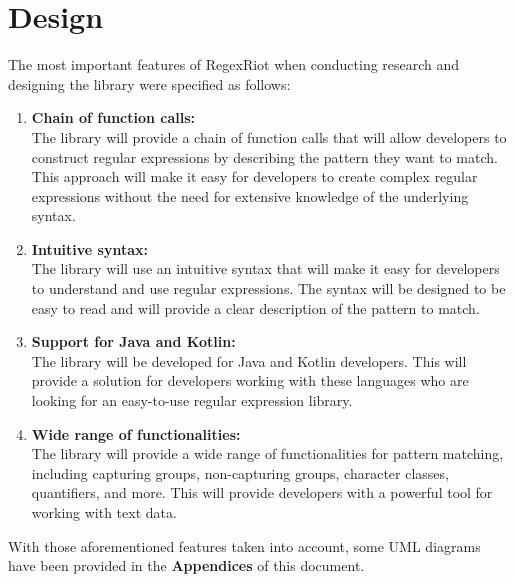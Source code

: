 \documentclass[conference]{IEEEtran}
\begin{document}
\section{Design}

The most important features of RegexRiot when conducting research and
designing the library were specified as follows:

\begin{enumerate}
    \item \textbf{Chain of function calls:}\\
          The library will provide a chain of function calls that will allow developers
          to construct regular expressions by describing the pattern they want to match.
          This approach will make it easy for developers to create complex regular expressions
          without the need for extensive knowledge of the underlying syntax.

    \item \textbf{Intuitive syntax:}\\
          The library will use an intuitive syntax that will make it easy for developers
          to understand and use regular expressions. The syntax will be designed to be easy
          to read and will provide a clear description of the pattern to match.

    \item \textbf{Support for Java and Kotlin:}\\
          The library will be developed for Java and Kotlin developers. \cite{oracle_docs1997}
          This will provide a solution for developers working with these languages who are
          looking for an easy-to-use regular expression library.\cite{kotlin_docs2023}

          \vfill\eject

    \item \textbf{Wide range of functionalities:}\\
          The library will provide a wide range of functionalities for pattern matching,
          including capturing groups, non-capturing groups, character classes, quantifiers,
          and more. This will provide developers with a powerful tool for working with text data.
\end{enumerate}

With those aforementioned features taken into account,
some UML diagrams have been provided in the \textbf{Appendices} of this
document.
\end{document}
